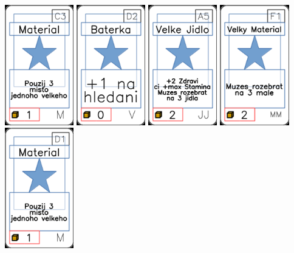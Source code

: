 \documentclass[a4paper]{article}
\begin{document}
	\includegraphics[width=3.0cm]{img-1_42}
	\includegraphics[width=3.0cm]{img-1_76}
	\includegraphics[width=3.0cm]{img-1_34}
	\includegraphics[width=3.0cm]{img-1_55}
	\includegraphics[width=3.0cm]{img-1_45}
\end{document}
